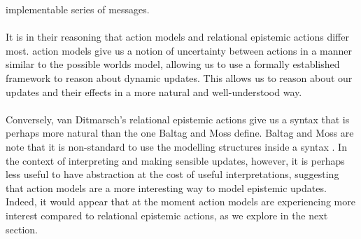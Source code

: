 \documentclass[12pt, a4paper, titlepage]{scrartcl}
\begin{document}
implementable series of messages.\\
\\
It is in their reasoning that action models and relational epistemic actions
differ most.
action models give us a notion of uncertainty between actions in a manner
similar to the possible worlds model, allowing us to use a formally established framework
to reason about dynamic updates.
This allows us to reason about our updates and their effects in a more natural
and well-understood way.\\
\\
Conversely, van Ditmarsch's relational epistemic actions give us a syntax that
is perhaps more natural than the one Baltag and Moss define.
Baltag and Moss are note that it is non-standard to use the modelling structures
inside a syntax \cite{baltag2005programs}.
In the context of interpreting and making sensible updates, however, it is
perhaps less useful to have abstraction at the cost of useful interpretations,
suggesting that action models are a more interesting way to model epistemic
updates.
Indeed, it would appear that at the moment action models are experiencing more
interest compared to relational epistemic actions, as we explore in the next
section.
\end{document}
